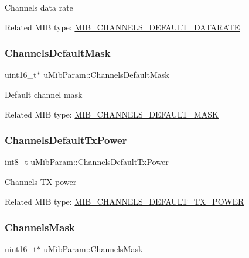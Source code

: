 Channels data rate

Related M\+IB type\+: \hyperlink{group__LORAMAC_gga32ea83d13a3f5bb4b3ec2ace2319ab61addef34adbf844ace9eeea97ae93da918}{M\+I\+B\+\_\+\+C\+H\+A\+N\+N\+E\+L\+S\+\_\+\+D\+E\+F\+A\+U\+L\+T\+\_\+\+D\+A\+T\+A\+R\+A\+TE} \mbox{\label{unionuMibParam_a5d650a767189429f903b22e785e0d4b0}} 
\subsubsection{\texorpdfstring{Channels\+Default\+Mask}{ChannelsDefaultMask}}
{\footnotesize\ttfamily uint16\+\_\+t$\ast$ u\+Mib\+Param\+::\+Channels\+Default\+Mask}

Default channel mask

Related M\+IB type\+: \hyperlink{group__LORAMAC_gga32ea83d13a3f5bb4b3ec2ace2319ab61a59afc276ca425cd4055ff5cb5b5fa946}{M\+I\+B\+\_\+\+C\+H\+A\+N\+N\+E\+L\+S\+\_\+\+D\+E\+F\+A\+U\+L\+T\+\_\+\+M\+A\+SK} \mbox{\label{unionuMibParam_adad323d47a9d1913172b0f40b8581a11}} 
\subsubsection{\texorpdfstring{Channels\+Default\+Tx\+Power}{ChannelsDefaultTxPower}}
{\footnotesize\ttfamily int8\+\_\+t u\+Mib\+Param\+::\+Channels\+Default\+Tx\+Power}

Channels TX power

Related M\+IB type\+: \hyperlink{group__LORAMAC_gga32ea83d13a3f5bb4b3ec2ace2319ab61a9c5b2d3ad2caf87710b09e8a6e68cc6a}{M\+I\+B\+\_\+\+C\+H\+A\+N\+N\+E\+L\+S\+\_\+\+D\+E\+F\+A\+U\+L\+T\+\_\+\+T\+X\+\_\+\+P\+O\+W\+ER} \mbox{\label{unionuMibParam_af7353a35521c6aa58ffee90589a98620}} 
\subsubsection{\texorpdfstring{Channels\+Mask}{ChannelsMask}}
{\footnotesize\ttfamily uint16\+\_\+t$\ast$ u\+Mib\+Param\+::\+Channels\+Mask}

